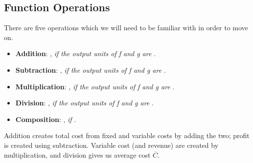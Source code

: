 \documentclass[notes]{subfiles}
\begin{document}
		\vspace*{-.5in}	
	\subsection*{Function Operations}
		There are five operations which we will need to be familiar with in order to move on.\\
		\begin{itemize}
			\item \textbf{Addition}: , \emph{if the output units of f and g are }.\\
			
			\item \textbf{Subtraction}: , \emph{if the output units of f and g are }.\\
			
			
			\item \textbf{Multiplication}: , \emph{if the output units of f and g are }.\\
			
			\item \textbf{Division}: , \emph{if the output units of f and g are }.\\
			
			\item \textbf{Composition}: , \emph{if }.
		\end{itemize}
			\vspace*{.05in}
			
		Addition creates total cost from fixed and variable costs by adding the two; profit is created using subtraction.  Variable cost (and revenue) are created by multiplication, and division gives us average cost $\overline{C}$.
		
\end{document}
